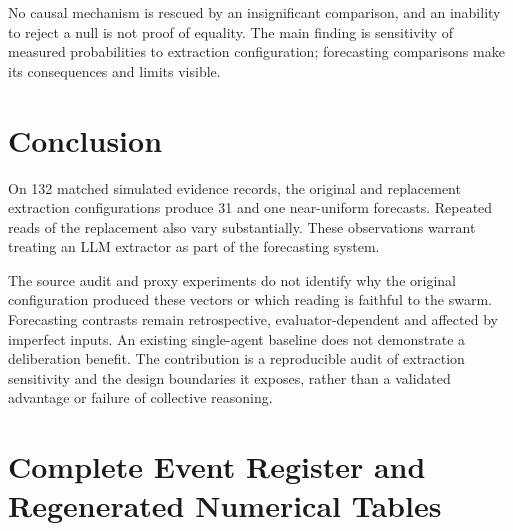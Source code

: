 \documentclass[10pt,conference]{IEEEtran}
\begin{document}
No causal mechanism is rescued by an insignificant comparison, and an inability
to reject a null is not proof of equality. The main finding is sensitivity of
measured probabilities to extraction configuration; forecasting comparisons
make its consequences and limits visible.

\section{Conclusion}
On 132 matched simulated evidence records, the original and replacement
extraction configurations produce 31 and one near-uniform forecasts. Repeated
reads of the replacement also vary substantially. These observations warrant
treating an LLM extractor as part of the forecasting system.

The source audit and proxy experiments do not identify why the original
configuration produced these vectors or which reading is faithful to the
swarm. Forecasting contrasts remain retrospective, evaluator-dependent and
affected by imperfect inputs. An existing single-agent baseline does not
demonstrate a deliberation benefit. The contribution is a reproducible audit
of extraction sensitivity and the design boundaries it exposes, rather than
a validated advantage or failure of collective reasoning.

\clearpage
\appendices

\clearpage
\section{Complete Event Register and Regenerated Numerical Tables}
\label{sec:full_tables}
\label{sec:per_event_tables}

\clearpage
\end{document}
